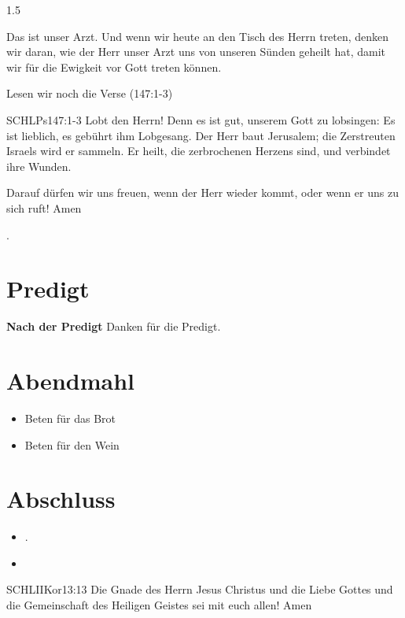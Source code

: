 \documentclass[fontsize=14pt]{../../inc/mybib}
\begin{document}
\begin{spacing}{1.5}
\begin{block}
        Das ist unser Arzt.  Und wenn wir heute an den Tisch des Herrn treten, denken wir daran, wie der Herr unser Arzt uns von unseren Sünden geheilt hat, damit wir für die Ewigkeit vor Gott treten können.

        Lesen wir noch die Verse (147:1-3)
        \begin{bibelbox}{SCHL}{Ps}{147:1-3}
        Lobt den Herrn! Denn es ist gut, unserem Gott zu lobsingen: Es ist lieblich, es gebührt ihm Lobgesang. Der Herr baut Jerusalem; die Zerstreuten Israels wird er sammeln. Er heilt, die zerbrochenen Herzens sind, und verbindet ihre Wunden.
        \end{bibelbox}
        Darauf dürfen wir uns freuen, wenn der Herr wieder kommt, oder wenn er uns zu sich ruft! Amen
    \end{block}
    
    .
\end{spacing}
\section{Predigt}
\textbf{Nach der Predigt}\newline
Danken für die Predigt.
\section{Abendmahl}
\begin{itemize}
    \item [] Beten für das Brot
    \item [] Beten für den Wein
\end{itemize}
\section{Abschluss}
\begin{itemize}
    \item [] .
    \item [] 
\end{itemize}
\begin{bibelbox}{SCHL}{IIKor}{13:13}
    Die Gnade des Herrn Jesus Christus und die Liebe Gottes und die Gemeinschaft des Heiligen Geistes sei mit euch allen! Amen
\end{bibelbox}
\end{document}
